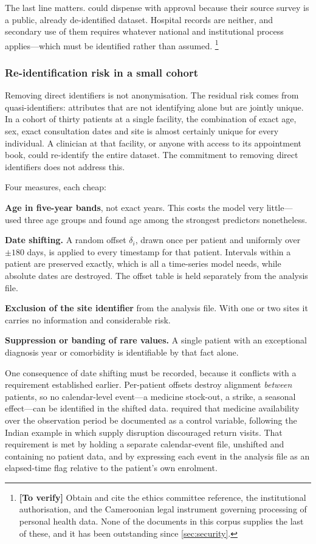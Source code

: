 \documentclass[12pt,a4paper,oneside]{report}
\newcommand{\verify}[1]{\footnote{\textbf{[To verify]} #1}}
\begin{document}
The last line matters. \Textcite{mendoza2025} could dispense with approval because their source survey is a public, already de-identified dataset. Hospital records are neither, and secondary use of them requires whatever national and institutional process applies---which must be identified rather than assumed.%
\verify{Obtain and cite the ethics committee reference, the institutional authorisation, and the Cameroonian legal instrument governing processing of personal health data. None of the documents in this corpus supplies the last of these, and it has been outstanding since \cref{sec:security}.}

\subsubsection{Re-identification risk in a small cohort}\label{sec:reident}

Removing direct identifiers is not anonymisation. The residual risk comes from quasi-identifiers: attributes that are not identifying alone but are jointly unique. In a cohort of thirty patients at a single facility, the combination of exact age, sex, exact consultation dates and site is almost certainly unique for every individual. A clinician at that facility, or anyone with access to its appointment book, could re-identify the entire dataset. The commitment to removing direct identifiers does not address this.

Four measures, each cheap:

\textbf{Age in five-year bands}, not exact years. This costs the model very little---\textcite{mendoza2025} used three age groups and found age among the strongest predictors nonetheless.

\textbf{Date shifting.} A random offset $\delta_i$, drawn once per patient and uniformly over $\pm 180$ days, is applied to every timestamp for that patient. Intervals within a patient are preserved exactly, which is all a time-series model needs, while absolute dates are destroyed. The offset table is held separately from the analysis file.

\textbf{Exclusion of the site identifier} from the analysis file. With one or two sites it carries no information and considerable risk.

\textbf{Suppression or banding of rare values.} A single patient with an exceptional diagnosis year or comorbidity is identifiable by that fact alone.

One consequence of date shifting must be recorded, because it conflicts with a requirement established earlier. Per-patient offsets destroy alignment \emph{between} patients, so no calendar-level event---a medicine stock-out, a strike, a seasonal effect---can be identified in the shifted data.  required that medicine availability over the observation period be documented as a control variable, following the Indian example in which supply disruption discouraged return visits. That requirement is met by holding a separate calendar-event file, unshifted and containing no patient data, and by expressing each event in the analysis file as an elapsed-time flag relative to the patient's own enrolment.
\end{document}

